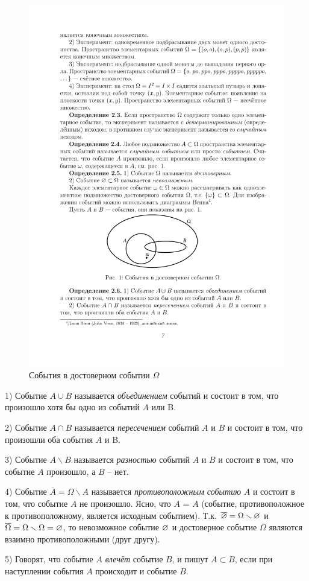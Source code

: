 \begin{figure}[h!]
	\centering
	\includegraphics[]{pic/pic1}
	\caption{События в достоверном событии $\Omega$}
	\label{fig1}
\end{figure}

\begin{definition}
1) Событие $A \cup B$ называется \textit{объединением} событий и состоит в том, что произошло хотя бы одно из событий $A$ или B.

2) Событие $A\cap B$ называется \textit{пересечением} событий $A$ и $B$ и состоит в
том, что произошли оба события $A$ и B.

3) Событие $A\backslash B$ называется \textit{разностью} событий $A$ и $B$ и состоит в том,
что событие $A$ произошло, а $B$ -- нет.

4) Событие $\overline{A}=\Omega\backslash A$ называется \textit{противоположным событию} $A$ и состоит в том, что событие $A$ не произошло. Ясно, что $A$ = $A$ (событие, противоположное к противоположному, является исходным событием).
Т.к. $\overline{\varnothing}=\Omega\smallsetminus\varnothing$ и $\overline{\Omega}=\Omega\smallsetminus\Omega=\varnothing$, то невозможное событие $\varnothing$ и
достоверное событие $\Omega$ являются взаимно противоположными (друг другу).

5) Говорят, что событие $A$ \textit{влечёт} событие $B$, и пишут $A\subset B$, если при
наступлении события $A$ происходит и событие $B$.
\end{definition}


